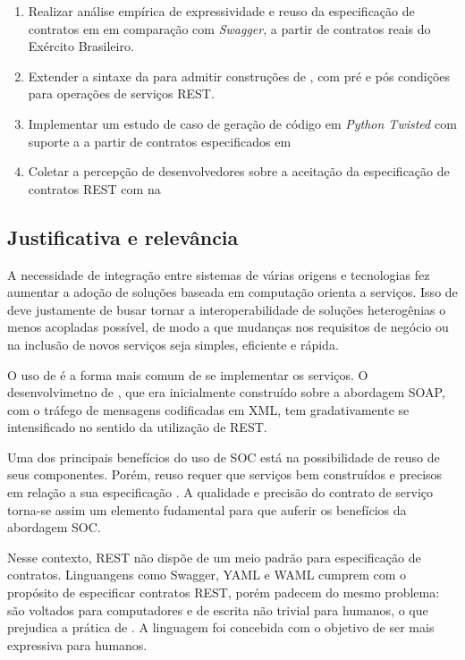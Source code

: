\begin{enumerate}
  \item Realizar análise empírica de expressividade e reuso da especificação de
  contratos em \neoidl{} em comparação com \textit{Swagger}, a partir de contratos
  reais do Exército Brasileiro.
  \item Extender a sintaxe da \neoidl{} para admitir construções de 
  \designbycontract, com pré e pós condições para operações de serviços REST.
  \item Implementar um estudo de caso de geração de código em \textit{Python
  Twisted} com suporte a \designbycontract a partir de contratos especificados
  em \neoidl
  \item Coletar a percepção de desenvolvedores sobre a aceitação da
  especificação de contratos REST com \designbycontract na \neoidl{}
\end{enumerate}


\subsection{Justificativa e relevância}
\vspace{-6mm}

A necessidade de integração entre sistemas de várias origens e tecnologias fez
aumentar a adoção de soluções baseada em computação orienta a serviços. Isso de
deve justamente de busar tornar a interoperabilidade de soluções heterogênias
o menos acopladas possível, de modo a que mudanças nos requisitos de negócio ou
na inclusão de novos serviços seja simples, eficiente e rápida.

O uso de \ws{} é a forma mais comum de se implementar os serviços. O
desenvolvimetno de \ws{}, que era inicialmente construído sobre a abordagem
SOAP, com o tráfego de mensagens codificadas em XML, tem gradativamente se
intensificado no sentido da utilização de REST.

Uma dos principais benefícios do uso de SOC está na possibilidade de reuso de
seus componentes. Porém, reuso requer que serviços bem construídos e precisos em
relação a sua especificação \cite{jazequel1997design}. A qualidade e precisão do
contrato de serviço torna-se assim um elemento fudamental para que auferir os benefícios da
abordagem SOC.

Nesse contexto, REST não dispõe de um meio padrão para especificação de
contratos. Linguangens como Swagger, YAML e WAML cumprem com o propósito de
especificar contratos REST, porém padecem do mesmo problema: são voltados para
computadores e de escrita não trivial para humanos, o que prejudica a prática de
\CtFirst{}. A linguagem \neoidl{} foi concebida com o objetivo de ser mais
expressiva para humanos.

